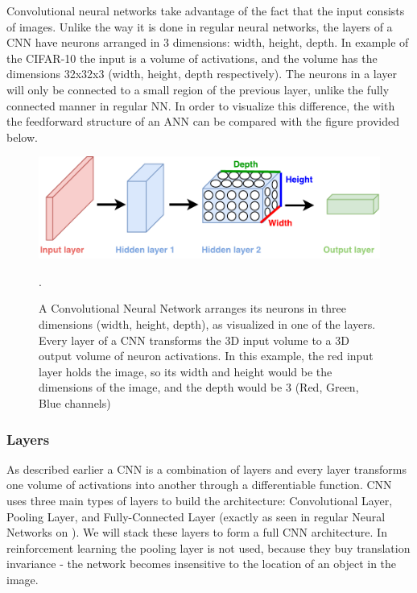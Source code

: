 Convolutional neural networks take advantage of the fact that the input consists of images. Unlike the way it is done in regular neural networks, the layers of a CNN have neurons arranged in 3 dimensions: width, height, depth. In example of the CIFAR-10 \cite{CIFAR_10} the input is a volume of activations, and the volume has the dimensions 32x32x3 (width, height, depth respectively). The neurons in a layer will only be connected to a small region of the previous layer, unlike the fully connected manner in regular NN. In order to visualize this difference, the  with the feedforward structure of an ANN can be compared with the figure  provided below.

\begin{figure}[H]
	\centering
	\includegraphics[width=1\textwidth]{Figures/NN_vs_CNN.pdf}
	\caption{A Convolutional Neural Network arranges its neurons in three dimensions (width, height, depth), as visualized in one of the layers. Every layer of a CNN transforms the 3D input volume to a 3D output volume of neuron activations. In this example, the red input layer holds the image, so its width and height would be the dimensions of the image, and the depth would be 3 (Red, Green, Blue channels) \cite{CNN_course}}.
	\label{fig:NN_vs_CNN}
\end{figure}

\subsubsection{Layers}
As described earlier a CNN is a combination of layers and every layer transforms one volume of activations into another through a differentiable function. CNN uses three main types of layers to build the architecture: Convolutional Layer, Pooling Layer, and Fully-Connected Layer (exactly as seen in regular Neural Networks on ). We will stack these layers to form a full CNN architecture. In reinforcement learning the pooling layer is not used, because they buy translation invariance - the network becomes insensitive to the location of an object in the image.

